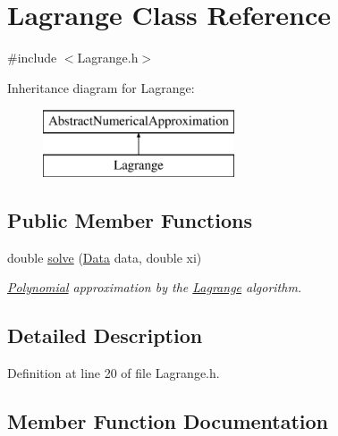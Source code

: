 \hypertarget{class_lagrange}{}\section{Lagrange Class Reference}
\label{class_lagrange}


{\ttfamily \#include $<$Lagrange.\+h$>$}

Inheritance diagram for Lagrange\+:\begin{figure}[H]
\begin{center}
\leavevmode
\includegraphics[height=2.000000cm]{class_lagrange}
\end{center}
\end{figure}
\subsection*{Public Member Functions}
\begin{DoxyCompactItemize}
\item 
double \mbox{\hyperlink{class_lagrange_ae594d62255b52ff05d874d9cc887ef34}{solve}} (\mbox{\hyperlink{struct_data}{Data}} data, double xi)
\begin{DoxyCompactList}\small\item\em \mbox{\hyperlink{class_polynomial}{Polynomial}} approximation by the \mbox{\hyperlink{class_lagrange}{Lagrange}} algorithm. \end{DoxyCompactList}\end{DoxyCompactItemize}


\subsection{Detailed Description}


Definition at line 20 of file Lagrange.\+h.



\subsection{Member Function Documentation}
\mbox{\label{class_lagrange_ae594d62255b52ff05d874d9cc887ef34}} 
